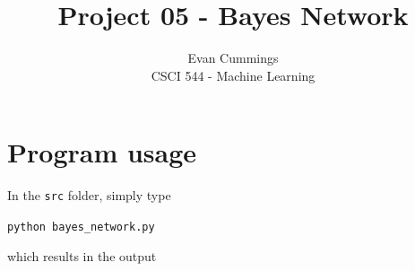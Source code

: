 
\DeclareMathOperator*{\argmax}{arg\,max}

\usepackage[top=.5in, bottom=1in, left=.75in, right=.75in]{geometry}
\usepackage{framed}
\setlength{\columnsep}{8mm}


\small
\twocolumn

\title{Project 05 - Bayes Network}
\author{Evan Cummings\\
CSCI 544 - Machine Learning}

\maketitle

\section{Program usage}

In the \texttt{src} folder, simply type

\centerline{\texttt{python bayes\_network.py}}

\noindent which results in the output

